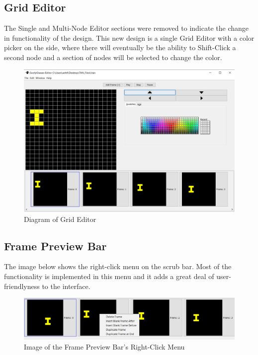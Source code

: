 \documentclass[12pt]{article}
\begin{document}
		\subsection {Grid Editor}
		\forceindent The Single and Multi-Node Editor sections were removed to indicate the change in functionality of the design. This new design is a single Grid Editor with a color picker on the side, where there will eventually be the ability to Shift-Click a second node and a section of nodes will be selected to change the color.
    
    \begin{figure}[ht!]
      \centering
      \includegraphics[width=120mm]{gridEditor.PNG}
      \caption{Diagram of Grid Editor}
    \end{figure}
		\newpage
		
		\subsection {Frame Preview Bar}
		\forceindent The image below shows the right-click menu on the scrub bar. Most of the functionality is implemented in this menu and it adds a great deal of user-friendlyness to the interface.
		
		\begin{figure}[ht!]
			\centering
				\includegraphics[width=160mm]{rtClick.PNG}
			\caption{Image of the Frame Preview Bar's Right-Click Menu}
		\end{figure}
			
		\clearpage
		
		
\end{document}
